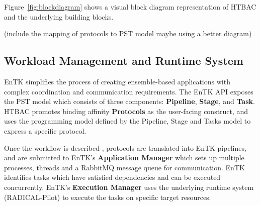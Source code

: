 Figure~\ref{fig:blockdiagram} shows a visual block diagram representation
 of HTBAC and the underlying building
blocks.

(include the mapping of protocols to PST model maybe using a better
diagram)

\subsection{Workload Management and Runtime System}

EnTK simplifies the process of creating ensemble-based applications with
complex coordination and communication requirements. The EnTK API exposes the
PST model which consists of three components: \textbf{Pipeline}, \textbf{Stage}, and \textbf{Task}. HTBAC
promotes binding affinity \textbf{Protocols} as the user-facing construct,
and uses the programming model defined by the Pipeline, Stage and Tasks model
to express a specific protocol. 





Once the workflow is described , protocols are translated
into EnTK pipelines, and are submitted to EnTK's \textbf{Application Manager}
which sets up multiple processes, threads and a RabbitMQ message queue for
communication. EnTK identifies tasks which have satisfied dependencies and
can be executed concurrently. EnTK's \textbf{Execution Manager} uses the
underlying runtime system (RADICAL-Pilot) to execute the tasks on specific
target resources.

